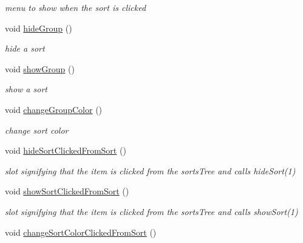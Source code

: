 \begin{DoxyCompactItemize}
\begin{DoxyCompactList}\small\item\em menu to show when the sort is clicked \end{DoxyCompactList}\item 
\hypertarget{classTreeArea_a7ec5a5d26a01615f6cc9acac55fd745e}{void \hyperlink{classTreeArea_a7ec5a5d26a01615f6cc9acac55fd745e}{hide\+Group} ()}\label{classTreeArea_a7ec5a5d26a01615f6cc9acac55fd745e}

\begin{DoxyCompactList}\small\item\em hide a sort \end{DoxyCompactList}\item 
\hypertarget{classTreeArea_a676a80fa10cb0d43a4bef32180679c2b}{void \hyperlink{classTreeArea_a676a80fa10cb0d43a4bef32180679c2b}{show\+Group} ()}\label{classTreeArea_a676a80fa10cb0d43a4bef32180679c2b}

\begin{DoxyCompactList}\small\item\em show a sort \end{DoxyCompactList}\item 
\hypertarget{classTreeArea_ac59ce87a367e3b0657718a57b718760d}{void \hyperlink{classTreeArea_ac59ce87a367e3b0657718a57b718760d}{change\+Group\+Color} ()}\label{classTreeArea_ac59ce87a367e3b0657718a57b718760d}

\begin{DoxyCompactList}\small\item\em change sort color \end{DoxyCompactList}\item 
\hypertarget{classTreeArea_adf29861998cba6d9ae174a50c37a7fac}{void \hyperlink{classTreeArea_adf29861998cba6d9ae174a50c37a7fac}{hide\+Sort\+Clicked\+From\+Sort} ()}\label{classTreeArea_adf29861998cba6d9ae174a50c37a7fac}

\begin{DoxyCompactList}\small\item\em slot signifying that the item is clicked from the sorts\+Tree and calls hide\+Sort(1) \end{DoxyCompactList}\item 
\hypertarget{classTreeArea_a78a3ddc89efe14b41c825adb727dfdc6}{void \hyperlink{classTreeArea_a78a3ddc89efe14b41c825adb727dfdc6}{show\+Sort\+Clicked\+From\+Sort} ()}\label{classTreeArea_a78a3ddc89efe14b41c825adb727dfdc6}

\begin{DoxyCompactList}\small\item\em slot signifying that the item is clicked from the sorts\+Tree and calls show\+Sort(1) \end{DoxyCompactList}\item 
\hypertarget{classTreeArea_a961bd8aaf9272cc4c669b624d2e1fd96}{void \hyperlink{classTreeArea_a961bd8aaf9272cc4c669b624d2e1fd96}{change\+Sort\+Color\+Clicked\+From\+Sort} ()}\label{classTreeArea_a961bd8aaf9272cc4c669b624d2e1fd96}


\end{DoxyCompactItemize}
